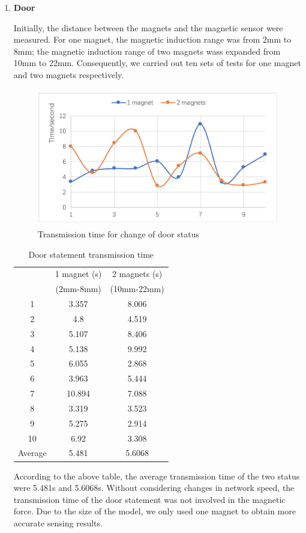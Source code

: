 \documentclass[12pt,a4paper]{report}
\begin{document}
\begin{enumerate}
	\item \textbf{Door}
	
	Initially, the distance between the magnets and the magnetic sensor were measured. For one magnet, the magnetic induction range was from 2mm to 8mm; the magnetic induction range of two magnets wass expanded from 10mm to 22mm. Consequently, we carried out ten sets of tests for one magnet and two magnets respectively.
	\begin{figure}[H]
		\centering
		\includegraphics[height=6cm,width=12cm]{figures/door.PNG}
		\caption{Transmission time for change of door status}
	\end{figure}
	\begin{table}[H]
		\centering
		\begin{tabular}{|c|c|c|}
			\hline
			&1 magnet (s)&2 magnets (s)\\ 
			&(2mm-8mm)&(10mm-22mm)\\ \hline
			1&3.357&8.006\\ \hline
			2&	4.8	&4.519
\\ \hline
			3&	5.107&	8.406
\\ \hline
			4&	5.138&	9.992
\\ \hline
			5&	6.055&	2.868
\\ \hline
			6&	3.963&	5.444
\\ \hline
			7&	10.894&	7.088
\\ \hline
			8&	3.319&	3.523
\\ \hline
			9&	5.275&	2.914
\\ \hline
			10&	6.92&	3.308
\\ \hline
			Average&	5.481&	5.6068
\\ \hline

		\end{tabular}
		\label{Door statement transmission time}
		\caption{Door statement transmission time}
	\end{table}
According to the above table, the average transmission time of the two status were 5.481s and 5.6068s. Without considering changes in network speed, the transmission time of the door statement was not involved in the magnetic force. Due to the size of the model, we only used one magnet to obtain more accurate sensing results.


\end{enumerate}
\end{document}
